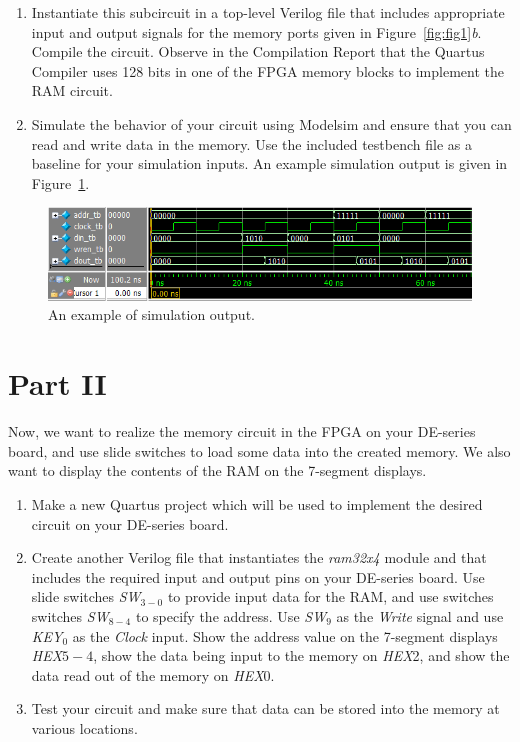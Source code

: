 \documentclass[epsfig,10pt,fullpage]{article}
\begin{document}
\begin{enumerate}
\item Instantiate this subcircuit in a top-level Verilog file that includes appropriate input and 
output signals for the memory ports given in Figure~\ref{fig:fig1}{\it b}. Compile the circuit. 
Observe in the Compilation Report that the Quartus 
Compiler uses 128 bits in one of the FPGA memory blocks to implement the RAM circuit.
\item Simulate the behavior of your circuit using Modelsim and ensure that you can read and write data in
the memory. Use the included testbench file as a baseline for your simulation inputs.
An example simulation output is given in Figure~\ref{fig:figsim}.
\end{enumerate}

\begin{figure}[H]
	\begin{center}
		\includegraphics[scale=0.8]{figures/simulation.png}
	\end{center}
	\caption{An example of simulation output.}
	\label{fig:figsim}
\end{figure}

\newpage
\section*{Part II}
Now, we want to realize the memory circuit in the FPGA on your DE-series board, and 
use slide switches to load some data into the created memory. 
We also want to display the contents of the RAM on the 7-segment displays.
\begin{enumerate}
\item Make a new Quartus project which will be used to 
implement the desired circuit on your DE-series board.
\item Create another Verilog file that instantiates the {\it ram32x4} module and that
includes the required input and output pins on your DE-series board. 
Use slide switches {\it SW}$_{3-0}$ to provide input data for
the RAM, and use switches switches {\it SW}$_{8-4}$ to specify the address. 
Use {\it SW}$_{9}$ as the {\it Write} signal and use {\it KEY}$_0$ as the {\it Clock} input. 
Show the address value on the 7-segment displays {\it HEX}$5-4$, show the
data being input to the memory on {\it HEX}2, and show the data read out
of the memory on {\it HEX}0. 
\item Test your circuit and make sure that data can be stored into the memory at various
locations.
\end{enumerate}
\end{document}

